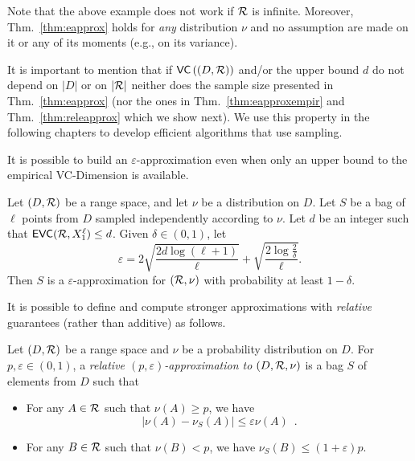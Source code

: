 Note that the above example does not work if $\mathcal{R}$ is infinite. Moreover,
Thm.~\ref{thm:eapprox} holds for \emph{any} distribution $\nu$ and no assumption
are made on it or any of its moments (e.g., on its variance).

It is important to mention that if $\mathsf{VC}\left((D,\mathcal{R})\right)$ and/or the upper
bound $d$ do not depend on $|D|$ or on $|\mathcal{R}|$ neither does the sample size
presented in Thm.~\ref{thm:eapprox} (nor the ones in Thm.~\ref{thm:eapproxempir}
and Thm.~\ref{thm:releapprox} which we show next). We use this property in the
following chapters to develop efficient algorithms that use sampling.

It is possible to build an $\varepsilon$-approximation even when only an upper
bound to the empirical VC-Dimension is available.
\begin{theorem}\label{thm:eapproxempir}
  Let $(D,\mathcal{R})$ be a range space, and let $\nu$ be a distribution on $D$. Let
  $S$ be a bag of $\ell$ points from $D$ sampled independently according
  to $\nu$. Let $d$ be an integer such that $\mathsf{EVC}(\mathcal{R},X_1^\ell)\le d$.
  Given $\delta\in(0,1)$, let 
  \begin{equation}\label{eq:evceapprox}
    \varepsilon =
    2\sqrt{\frac{2d\log(\ell+1)}{\ell}}+\sqrt{\frac{2\log\frac{2}{\delta}}{\ell}}.
  \end{equation}
   Then $S$ is a $\varepsilon$-approximation for $(\mathcal{R},\nu)$
   with probability at least $1-\delta$.
 \end{theorem}

It is possible to define and compute stronger approximations with \emph{relative}
guarantees (rather than additive) as follows.
\begin{definition}\label{def:releapprox}
  Let $(D,\mathcal{R})$ be a range space  and $\nu$ be a probability distribution on
  $D$. For $p,\varepsilon\in (0,1)$, a \emph{relative
  $(p,\varepsilon)$-approximation to $(D,\mathcal{R},\nu)$} is a bag $S$ of elements
  from $D$ such that 
  \begin{itemize}
    \item For any $A\in\mathcal{R}$ such that $\nu(A)\ge p$, we have 
      \[ |\nu(A) - \nu_S(A)|\le \varepsilon\nu(A)\enspace.\]
    \item For any $B\in\mathcal{R}$ such that $\nu(B)< p$, we have $\nu_S(B)\le
      (1+\varepsilon)p$.
  \end{itemize}
\end{definition}

